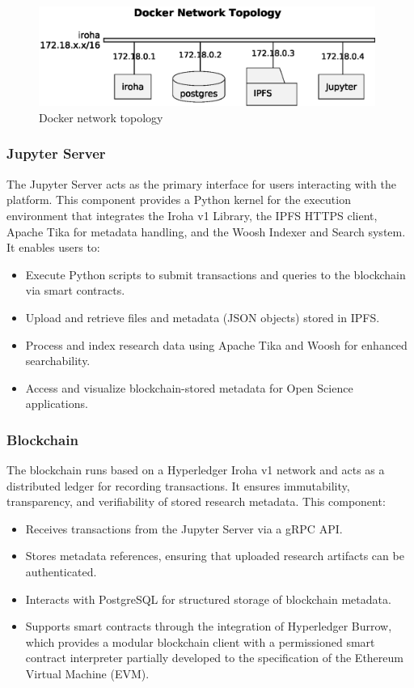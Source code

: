 \documentclass[final]{rc-book-2.14}
\begin{document}
\begin{figure}[htbp]
    \centering
    \includegraphics[width=0.98\textwidth, keepaspectratio]{fig/network_topology.eps}
    \caption{Docker network topology}
    \label{fig:docker_ntw_topology}
\end{figure}

\subsubsection{Jupyter Server}
The Jupyter Server acts as the primary interface for users interacting with the platform. This component provides a Python kernel for the execution environment that integrates the Iroha v1 Library, the IPFS HTTPS client, Apache Tika for metadata handling, and the Woosh Indexer and Search system. It enables users to:

\begin{itemize}
    \item Execute Python scripts to submit transactions and queries to the blockchain via smart contracts.
    \item Upload and retrieve files and metadata (JSON objects) stored in IPFS.
    \item Process and index research data using Apache Tika and Woosh for enhanced searchability.
    \item Access and visualize blockchain-stored metadata for Open Science applications.
\end{itemize}

\subsubsection{Blockchain}
The blockchain runs based on a Hyperledger Iroha v1 network and acts as a distributed ledger for recording transactions. It ensures immutability, transparency, and verifiability of stored research metadata. This component:
\begin{itemize}
    \item Receives transactions from the Jupyter Server via a gRPC API.
    \item Stores metadata references, ensuring that uploaded research artifacts can be authenticated.
    \item Interacts with PostgreSQL for structured storage of blockchain metadata.
    \item Supports smart contracts through the integration of Hyperledger Burrow, which provides a modular blockchain client with a permissioned smart contract interpreter partially developed to the specification of the Ethereum Virtual Machine (EVM).

\end{itemize}
\end{document}
